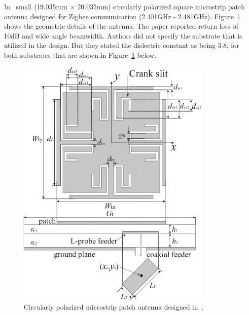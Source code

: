 \documentclass[12pt, oneandhalf, chaparabic, sees, ms]{metu}
\begin{document}
In~\cite{fujimoto2015} small (19.035mm $\times$ 20.035mm) circularly polarized square microstrip patch antenna designed for Zigbee communication (2.401GHz - 2.481GHz).
Figure~\ref{fig:fujimoto} shows the geometric details of the antenna. The paper reported return loss of 10dB and wide angle beamwidth. 
Authors did not specify the substrate that is utilized in the design. But they stated the dielectric constant as being 3.8,
for both substrates that are shown in Figure~\ref{fig:fujimoto} below.
\vspace{1cm}
%
%
%
\begin{figure}[!htbp]
 \begin{center}
  \includegraphics[width=0.85\textwidth]{fujimoto-antenna.png}
 \end{center}
 \caption{Circularly polarized microstrip patch antenna designed in~\cite{fujimoto2015}.}
  \label{fig:fujimoto}
\end{figure}
% 
%
%


\newpage
\end{document}
